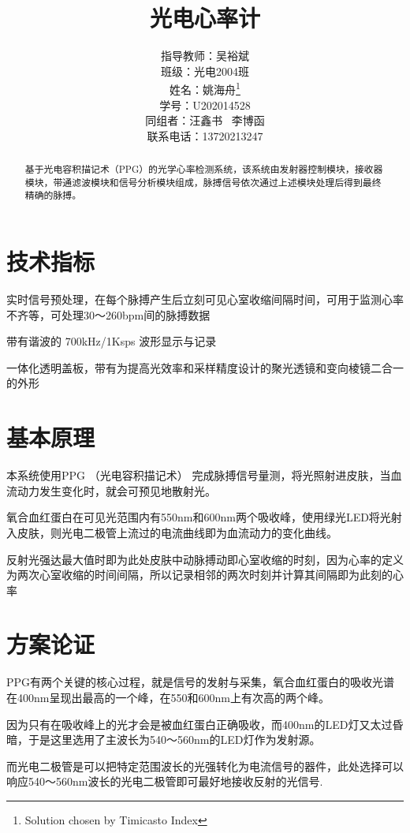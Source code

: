 \documentclass[a4paper]{ctexart}
\title{光电心率计}
\author{指导教师：吴裕斌 \\ 班级：光电2004班\\姓名：姚海舟\thanks{Solution chosen by Timicasto Index}\\学号：U202014528\\同组者：汪鑫书 \ 李博函\\联系电话：13720213247}
\begin{document}
\maketitle

\newpage
\tableofcontents

\newpage
\begin{abstract}
	基于光电容积描记术（PPG）的光学心率检测系统，该系统由发射器控制模块，接收器模块，带通滤波模块和信号分析模块组成，脉搏信号依次通过上述模块处理后得到最终精确的脉搏。
\end{abstract}


\newpage
\section{技术指标}

	实时信号预处理，在每个脉搏产生后立刻可见心室收缩间隔时间，可用于监测心率不齐等，可处理30～260bpm间的脉搏数据
	
	带有谐波的 700kHz/1Ksps 波形显示与记录
	
	一体化透明盖板，带有为提高光效率和采样精度设计的聚光透镜和变向棱镜二合一的外形

\newpage
\section{基本原理}

	本系统使用PPG （光电容积描记术） 完成脉搏信号量测，将光照射进皮肤，当血流动力发生变化时，就会可预见地散射光。
	
	氧合血红蛋白在可见光范围内有550nm和600nm两个吸收峰，使用绿光LED将光射入皮肤，则光电二极管上流过的电流曲线即为血流动力的变化曲线。
	
	反射光强达最大值时即为此处皮肤中动脉搏动即心室收缩的时刻，因为心率的定义为两次心室收缩的时间间隔，所以记录相邻的两次时刻并计算其间隔即为此刻的心率

\newpage
\section{方案论证}
	
	PPG有两个关键的核心过程，就是信号的发射与采集，氧合血红蛋白的吸收光谱在400nm呈现出最高的一个峰，在550和600nm上有次高的两个峰。
	
	因为只有在吸收峰上的光才会是被血红蛋白正确吸收，而400nm的LED灯又太过昏暗，于是这里选用了主波长为540～560nm的LED灯作为发射源。
	
	而光电二极管是可以把特定范围波长的光强转化为电流信号的器件，此处选择可以响应540～560nm波长的光电二极管即可最好地接收反射的光信号.
	
\end{document}
